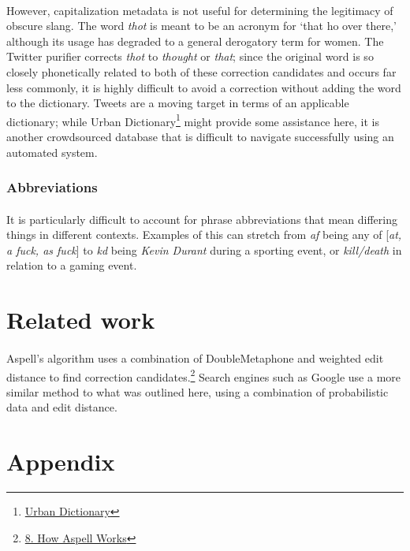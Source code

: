 \documentclass[twocolumn,10pt]{article}
\begin{document}
\paragraph{} However, capitalization metadata is not useful for determining the legitimacy of obscure slang. The word \textit{thot} is meant to be an acronym for `that ho over there,' although its usage has degraded to a general derogatory term for women. The Twitter purifier corrects \textit{thot} to \textit{thought} or \textit{that}; since the original word is so closely phonetically related to both of these correction candidates and occurs far less commonly, it is highly difficult to avoid a correction without adding the word to the dictionary. Tweets are a moving target in terms of an applicable dictionary; while Urban Dictionary\footnote{\href{http://www.urbandictionary.com/}{Urban Dictionary}} might provide some assistance here, it is another crowdsourced database that is difficult to navigate successfully using an automated system.
\subsubsection*{Abbreviations}
\paragraph{}It is particularly difficult to account for phrase abbreviations that mean differing things in different contexts. Examples of this can stretch from \textit{af} being any of [\textit{at, a fuck, as fuck}] to \textit{kd} being \textit{Kevin Durant} during a sporting event, or \textit{kill/death} in relation to a gaming event.

\section*{Related work}
\paragraph{} Aspell's algorithm uses a combination of DoubleMetaphone and weighted edit distance to find correction candidates.\footnote{\href{http://aspell.net/0.50-doc/man-html/8_How.html}{8. How Aspell Works}} Search engines such as Google use a more similar method to what was outlined here, using a combination of probabilistic data and edit distance.
\section*{Appendix}
\end{document}
